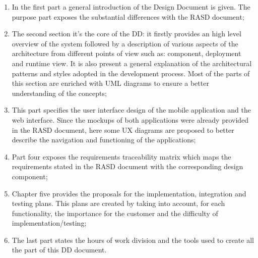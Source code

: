 \begin{enumerate}
  \item In the first part a general introduction of the Design Document is given. The purpose part exposes the substantial differences with the RASD document;
  \item The second section it's the core of the DD: it firstly provides an high level overview of the system followed by  a description of various aspects of the architecture from different points of view such as: component, deployment and runtime view. It is also present a general explanation of the architectural patterns and styles adopted in the development process. Most of the parts of this section are enriched with UML diagrams to ensure a better understanding of the concepts;
  \item This part specifies the user interface design of the mobile application and the web interface. Since the mockups of both applications were already provided in the RASD document, here some UX diagrams are proposed to better describe the navigation and functioning of the applications;
  \item Part four exposes the requirements traceability matrix which maps the requirements stated in the RASD document with the corresponding design component;
  \item Chapter five provides the proposals for the implementation, integration and testing plans. This plans are created by taking into account, for each functionality, the importance for the customer and the difficulty of implementation/testing;
  \item The last part states the hours of work division and the tools used to create  all the part of this DD document.
\end{enumerate}
